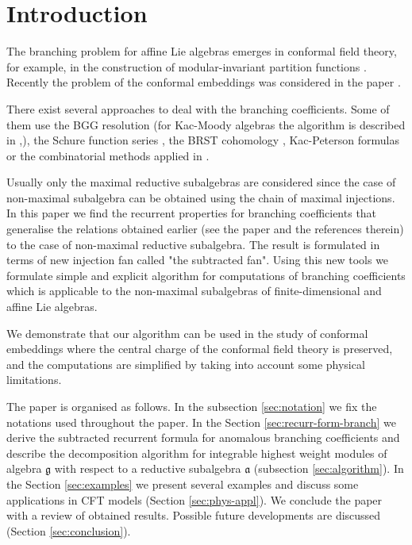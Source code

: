 \documentclass[a4paper,12pt]{article}
\theoremstyle{definition} \newtheorem{Def}{Definition}
\begin{document}
\section{Introduction}
\label{sec:introduction}

The branching problem for affine Lie algebras emerges in conformal field theory, for example, in the construction of modular-invariant partition functions \cite{difrancesco1997cft}. Recently the problem of the conformal embeddings was considered in the paper \cite{coquereaux2008conformal}.

There exist several approaches to deal with the branching coefficients. Some of them use the BGG
resolution \cite{bernstein1975differential} (for Kac-Moody algebras the algorithm is described in
\cite{kac1990idl},\cite{wakimoto2001idl}), the Schure function series \cite{fauser2006new}, the BRST
cohomology \cite{hwang1994general}, Kac-Peterson formulas \cite{kac1990idl,quella2002branching} or the
combinatorial methods applied in \cite{feigin707principal}.

Usually only the maximal reductive subalgebras are considered since the case of non-maximal subalgebra can be obtained using the chain of maximal injections. In this paper we find the recurrent properties for branching coefficients that generalise the relations obtained earlier (see the paper \cite{ilyin812pbc} and the references therein) to the case of non-maximal reductive subalgebra. The result is formulated in terms of new injection fan called "the subtracted fan". Using this new tools we formulate simple and explicit algorithm for computations of branching coefficients which is applicable to the non-maximal subalgebras of finite-dimensional and affine Lie algebras.

We demonstrate that our algorithm can be used in the study of conformal embeddings where the central charge of the conformal field theory is preserved, and the computations are simplified by taking into account some physical limitations.

The paper is organised as follows. In the subsection \ref{sec:notation}  we fix the notations used throughout the paper. In the Section \ref{sec:recurr-form-branch} we derive the subtracted recurrent formula for anomalous branching coefficients and describe the decomposition algorithm for integrable highest weight modules of algebra $\mathfrak{g}$ with respect to a reductive subalgebra $\mathfrak{a}$ (subsection \ref{sec:algorithm}). In the Section \ref{sec:examples} we present several examples and discuss some applications in CFT models (Section \ref{sec:phys-appl}). We conclude the paper with a review of obtained results. Possible future developments are discussed (Section \ref{sec:conclusion}).
\end{document}
